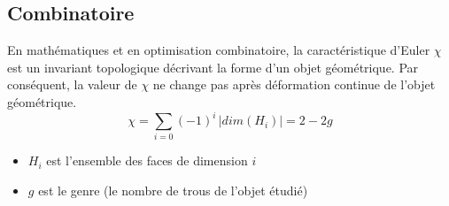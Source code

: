 \subsection{Combinatoire}
\noindent
En mathématiques et en optimisation combinatoire, la caractéristique d'Euler $\chi$ est un invariant topologique décrivant la forme d'un objet géométrique. Par conséquent, la valeur de $\chi$ ne change pas après déformation continue de l'objet géométrique.
\begin{equation}
\chi = \sum_{i=0} (-1)^i \, |dim(H_i)| = 2-2g
\end{equation}
\begin{itemize}
\item $H_i$ est l'ensemble des faces de dimension $i$
\item $g$ est le genre (le nombre de trous de l'objet étudié)\\ 
\end{itemize}

